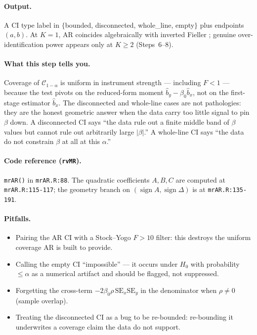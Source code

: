\documentclass[11pt]{article}
\begin{document}
\paragraph{Output.} A CI type label in $\{$bounded, disconnected, whole\_line, empty$\}$ plus endpoints $(a,b)$. At $K=1$, AR coincides algebraically with inverted Fieller \citep{Fieller1954}; genuine over-identification power appears only at $K\ge 2$ (Steps~6--8).

\paragraph{What this step tells you.} Coverage of $\mathcal{C}_{1-\alpha}$ is uniform in instrument strength --- including $F<1$ --- because the test pivots on the reduced-form moment $\hat b_y - \beta_0 \hat b_x$, not on the first-stage estimator $\hat b_x$. The disconnected and whole-line cases are not pathologies: they are the honest geometric answer when the data carry too little signal to pin $\beta$ down. A disconnected CI says ``the data rule out a finite middle band of $\beta$ values but cannot rule out arbitrarily large $|\beta|$.'' A whole-line CI says ``the data do not constrain $\beta$ at all at this $\alpha$.''

\paragraph{Code reference (\texttt{rvMR}).} \verb|mrAR()| in \verb|mrAR.R:88|. The quadratic coefficients $A,B,C$ are computed at \verb|mrAR.R:115-117|; the geometry branch on $(\operatorname{sign} A, \operatorname{sign}\Delta)$ is at \verb|mrAR.R:135-191|.

\paragraph{Pitfalls.}
\begin{itemize}
\item Pairing the AR CI with a Stock--Yogo $F>10$ filter: this destroys the uniform coverage AR is built to provide.
\item Calling the empty CI ``impossible'' --- it occurs under $H_0$ with probability $\le \alpha$ as a numerical artifact and should be flagged, not suppressed.
\item Forgetting the cross-term $-2\beta_0\rho\,\mathrm{SE}_x\mathrm{SE}_y$ in the denominator when $\rho\ne 0$ (sample overlap).
\item Treating the disconnected CI as a bug to be re-bounded: re-bounding it underwrites a coverage claim the data do not support.
\end{itemize}
\end{document}
